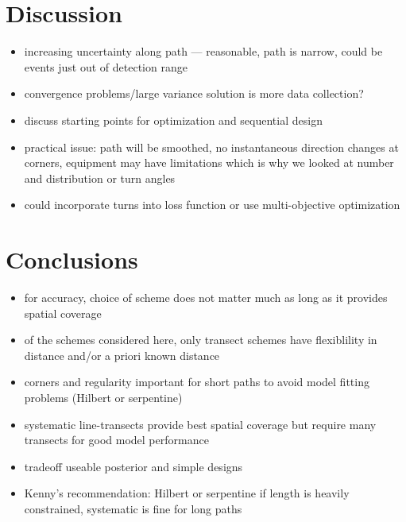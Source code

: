 \documentclass[review]{elsarticle}
\begin{document}
\section{Discussion}

\begin{itemize}
\item increasing uncertainty along path --- reasonable, path is narrow, could
be events just out of detection range

\item convergence problems/large variance solution is more data collection?

\item discuss starting points for optimization and sequential design

\item practical issue: path will be smoothed, no instantaneous direction
changes at corners, equipment may have limitations which is why we looked at
number and distribution or turn angles

\item could incorporate turns into loss function or use multi-objective
optimization~\citep{lark}
\end{itemize}


\section{Conclusions}

\begin{itemize}
\item for accuracy, choice of scheme does not matter much as long as it provides
spatial coverage

\item of the schemes considered here, only transect schemes have flexiblility
in distance and/or a priori known distance

\item corners and regularity important for short paths to avoid model fitting
problems (Hilbert or serpentine)

\item systematic line-transects provide best spatial coverage but require many
transects for good model performance

\item tradeoff useable posterior and simple designs

\item Kenny's recommendation: Hilbert or serpentine if length is heavily
constrained, systematic is fine for long paths
\end{itemize}
\end{document}
